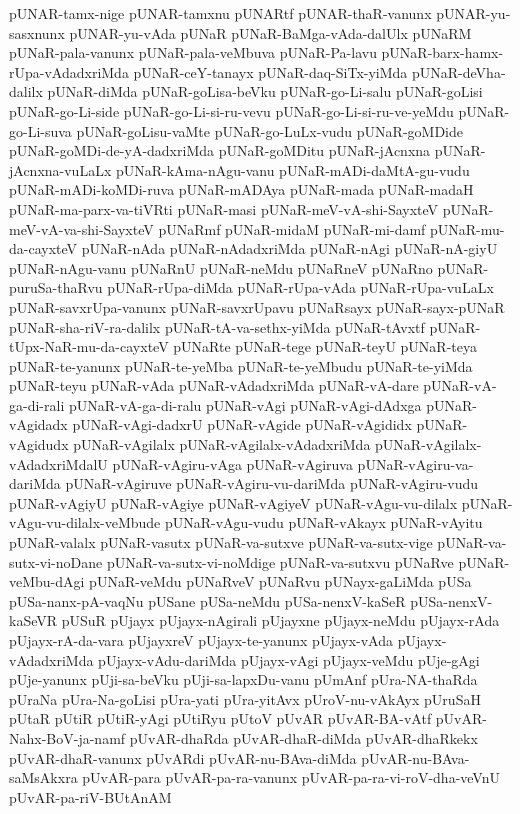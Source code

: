 {pUNAR-tamx-nige
pUNAR-tamxnu
pUNARtf
pUNAR-thaR-vanunx
pUNAR-yu-sasxnunx
pUNAR-yu-vAda
pUNaR
pUNaR-BaMga-vAda-dalUlx
pUNaRM
pUNaR-pala-vanunx
pUNaR-pala-veMbuva
pUNaR-Pa-lavu
pUNaR-barx-hamx-rUpa-vAdadxriMda
pUNaR-ceY-tanayx
pUNaR-daq-SiTx-yiMda
pUNaR-deVha-dalilx
pUNaR-diMda
pUNaR-goLisa-beVku
pUNaR-go-Li-salu
pUNaR-goLisi
pUNaR-go-Li-side
pUNaR-go-Li-si-ru-vevu
pUNaR-go-Li-si-ru-ve-yeMdu
pUNaR-go-Li-suva
pUNaR-goLisu-vaMte
pUNaR-go-LuLx-vudu
pUNaR-goMDide
pUNaR-goMDi-de-yA-dadxriMda
pUNaR-goMDitu
pUNaR-jAcnxna
pUNaR-jAcnxna-vuLaLx
pUNaR-kAma-nAgu-vanu
pUNaR-mADi-daMtA-gu-vudu
pUNaR-mADi-koMDi-ruva
pUNaR-mADAya
pUNaR-mada
pUNaR-madaH
pUNaR-ma-parx-va-tiVRti
pUNaR-masi
pUNaR-meV-vA-shi-SayxteV
pUNaR-meV-vA-va-shi-SayxteV
pUNaRmf
pUNaR-midaM
pUNaR-mi-damf
pUNaR-mu-da-cayxteV
pUNaR-nAda
pUNaR-nAdadxriMda
pUNaR-nAgi
pUNaR-nA-giyU
pUNaR-nAgu-vanu
pUNaRnU
pUNaR-neMdu
pUNaRneV
pUNaRno
pUNaR-puruSa-thaRvu
pUNaR-rUpa-diMda
pUNaR-rUpa-vAda
pUNaR-rUpa-vuLaLx
pUNaR-savxrUpa-vanunx
pUNaR-savxrUpavu
pUNaRsayx
pUNaR-sayx-pUNaR
pUNaR-sha-riV-ra-dalilx
pUNaR-tA-va-sethx-yiMda
pUNaR-tAvxtf
pUNaR-tUpx-NaR-mu-da-cayxteV
pUNaRte
pUNaR-tege
pUNaR-teyU
pUNaR-teya
pUNaR-te-yanunx
pUNaR-te-yeMba
pUNaR-te-yeMbudu
pUNaR-te-yiMda
pUNaR-teyu
pUNaR-vAda
pUNaR-vAdadxriMda
pUNaR-vA-dare
pUNaR-vA-ga-di-rali
pUNaR-vA-ga-di-ralu
pUNaR-vAgi
pUNaR-vAgi-dAdxga
pUNaR-vAgidadx
pUNaR-vAgi-dadxrU
pUNaR-vAgide
pUNaR-vAgididx
pUNaR-vAgidudx
pUNaR-vAgilalx
pUNaR-vAgilalx-vAdadxriMda
pUNaR-vAgilalx-vAdadxriMdalU
pUNaR-vAgiru-vAga
pUNaR-vAgiruva
pUNaR-vAgiru-va-dariMda
pUNaR-vAgiruve
pUNaR-vAgiru-vu-dariMda
pUNaR-vAgiru-vudu
pUNaR-vAgiyU
pUNaR-vAgiye
pUNaR-vAgiyeV
pUNaR-vAgu-vu-dilalx
pUNaR-vAgu-vu-dilalx-veMbude
pUNaR-vAgu-vudu
pUNaR-vAkayx
pUNaR-vAyitu
pUNaR-valalx
pUNaR-vasutx
pUNaR-va-sutxve
pUNaR-va-sutx-vige
pUNaR-va-sutx-vi-noDane
pUNaR-va-sutx-vi-noMdige
pUNaR-va-sutxvu
pUNaRve
pUNaR-veMbu-dAgi
pUNaR-veMdu
pUNaRveV
pUNaRvu
pUNayx-gaLiMda
pUSa
pUSa-nanx-pA-vaqNu
pUSane
pUSa-neMdu
pUSa-nenxV-kaSeR
pUSa-nenxV-kaSeVR
pUSuR
pUjayx
pUjayx-nAgirali
pUjayxne
pUjayx-neMdu
pUjayx-rAda
pUjayx-rA-da-vara
pUjayxreV
pUjayx-te-yanunx
pUjayx-vAda
pUjayx-vAdadxriMda
pUjayx-vAdu-dariMda
pUjayx-vAgi
pUjayx-veMdu
pUje-gAgi
pUje-yanunx
pUji-sa-beVku
pUji-sa-lapxDu-vanu
pUmAnf
pUra-NA-thaRda
pUraNa
pUra-Na-goLisi
pUra-yati
pUra-yitAvx
pUroV-nu-vAkAyx
pUruSaH
pUtaR
pUtiR
pUtiR-yAgi
pUtiRyu
pUtoV
pUvAR
pUvAR-BA-vAtf
pUvAR-Nahx-BoV-ja-namf
pUvAR-dhaRda
pUvAR-dhaR-diMda
pUvAR-dhaRkekx
pUvAR-dhaR-vanunx
pUvARdi
pUvAR-nu-BAva-diMda
pUvAR-nu-BAva-saMsAkxra
pUvAR-para
pUvAR-pa-ra-vanunx
pUvAR-pa-ra-vi-roV-dha-veVnU
pUvAR-pa-riV-BUtAnAM
}
